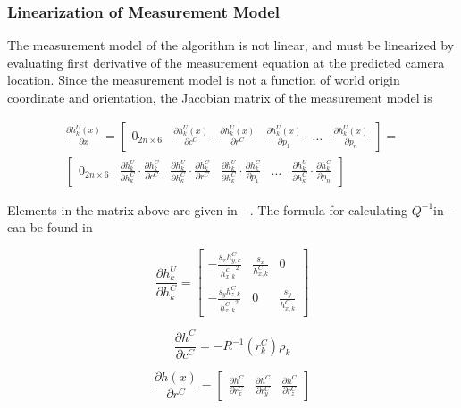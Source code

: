 \subsubsection{Linearization of Measurement Model}
The measurement model of the algorithm is not linear, and must be 
linearized by evaluating first derivative of the measurement equation at 
the predicted camera location. Since the measurement model is not a 
function of world origin coordinate and orientation, the Jacobian matrix 
of the measurement model is

\begin{multline}
\frac{\partial h_{k}^{U}(x)}{\partial x}=
\begin{bmatrix}
0_{2n\times 6} & \frac{\partial h_{k}^{U}(x)}{\partial c^{C}} &
\frac{\partial h_{k}^{U}(x)}{\partial r^{C}} &
\frac{\partial h_{k}^{U}(x)}{\partial p_{1}} & 
\ldots & \frac{\partial h_{k}^{U}(x)}{\partial p_{n}}
\end{bmatrix} = \\ \begin{bmatrix}
0_{2n\times 6} & 
\frac{\partial h_{k}^{U}}{\partial h_{k}^{C}} \cdot 
\frac{\partial h_{k}^{C}}{\partial c^{C}} & 
\frac{\partial h_{k}^{U}}{\partial h_{k}^{C}} \cdot 
\frac{\partial h_{k}^{C}}{\partial r^{C}} & 
\frac{\partial h_{k}^{U}}{\partial h_{k}^{C}} \cdot 
\frac{\partial h_{k}^{C}}{\partial p_{1}} & 
\ldots & 
\frac{\partial h_{k}^{U}}{\partial h_{k}^{C}} \cdot 
\frac{\partial h_{k}^{C}}{\partial p_{n}}
\end{bmatrix}
\end{multline}


Elements in the matrix above are given in - . The formula for 
calculating $Q^{-1}$in - can be found in 

\begin{equation}
\frac{\partial h_{k}^{U}}{\partial h_{k}^{C}}= \begin{bmatrix}
-\frac{s_{x}h_{y,k}^{C}}{{h_{x,k}^{C}}^{2}} & \frac{s_{x}}{h_{x,k}^{C}} & 0 \\
-\frac{s_{y}h_{z,k}^{C}}{{h_{x,k}^{C}}^{2}} & 0 & \frac{s_{y}}{h_{x,k}^{C}}
\end{bmatrix}
\end{equation}

\begin{equation}
\frac{\partial h^{C}}{\partial c^{C}}=-R^{-1}(r_{k}^{C})\rho _{k}
\end{equation}

\begin{equation}
\frac{\partial h(x)}{\partial r^{C}}=\begin{bmatrix} 
\frac{\partial h^{C}}{\partial r_{x}^{C}} & 
\frac{\partial h^{C}}{\partial r_{y}^{C}} & 
\frac{\partial h^{C}}{\partial r_{z}^{C}}\end{bmatrix}
\end{equation}


